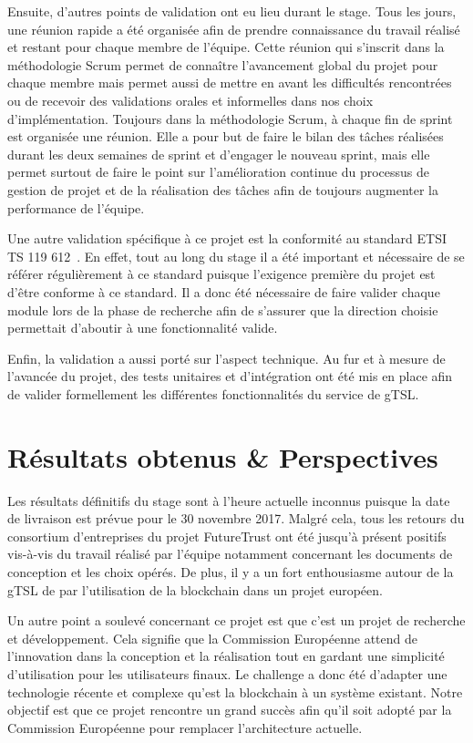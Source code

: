 \documentclass{tnreport}
\begin{document}
Ensuite, d'autres points de validation ont eu lieu durant le stage. Tous les jours, une réunion rapide a été organisée afin de prendre connaissance du travail réalisé et restant pour chaque membre de l'équipe. Cette réunion qui s'inscrit dans la méthodologie Scrum permet de connaître l'avancement global du projet pour chaque membre mais permet aussi de mettre en avant les difficultés rencontrées ou de recevoir des validations orales et informelles dans nos choix d'implémentation. Toujours dans la méthodologie Scrum, à chaque fin de sprint est organisée une réunion. Elle a pour but de faire le bilan des tâches réalisées durant les deux semaines de sprint et d'engager le nouveau sprint, mais elle permet surtout de faire le point sur l'amélioration continue du processus de gestion de projet et de la réalisation des tâches afin de toujours augmenter la performance de l'équipe. 

Une autre validation spécifique à ce projet est la conformité au standard ETSI TS 119 612~\cite{ETSITS119612}. En effet, tout au long du stage il a été important et nécessaire de se référer régulièrement à ce standard puisque l'exigence première du projet est d'être conforme à ce standard. Il a donc été nécessaire de faire valider chaque module lors de la phase de recherche afin de s'assurer que la direction choisie permettait d'aboutir à une fonctionnalité valide.

Enfin, la validation a aussi porté sur l'aspect technique. Au fur et à mesure de l'avancée du projet, des tests unitaires et d'intégration ont été mis en place afin de valider formellement les différentes fonctionnalités du service de gTSL.

\chapter{Résultats obtenus \& Perspectives}

Les résultats définitifs du stage sont à l'heure actuelle inconnus puisque la date de livraison est prévue pour le 30 novembre 2017. Malgré cela, tous les retours du consortium d'entreprises du projet FutureTrust ont été jusqu'à présent positifs vis-à-vis du travail réalisé par l'équipe notamment concernant les documents de conception et les choix opérés. De plus, il y a un fort enthousiasme autour de la gTSL de par l'utilisation de la blockchain dans un projet européen.

Un autre point a soulevé concernant ce projet est que c'est un projet de recherche et développement. Cela signifie que la Commission Européenne attend de l'innovation dans la conception et la réalisation tout en gardant une simplicité d'utilisation pour les utilisateurs finaux. Le challenge a donc été d'adapter une technologie récente et complexe qu'est la blockchain à un système existant. Notre objectif est que ce projet rencontre un grand succès afin qu'il soit adopté par la Commission Européenne pour remplacer l'architecture actuelle.
\end{document}
